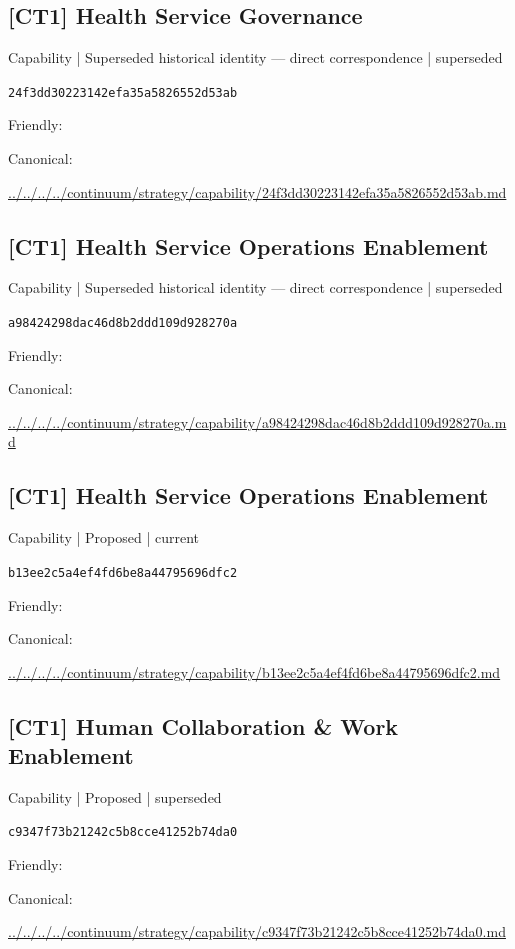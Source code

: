 \documentclass[10pt,a4paper]{article}
\begin{document}
\subsection*{[CT1] Health Service Governance}
{\small Capability | Superseded historical identity — direct correspondence | superseded}\par
\texttt{24f3dd30223142efa35a5826552d53ab}\par
Friendly: \par
Canonical: \par
{\footnotesize\url{../../../../continuum/strategy/capability/24f3dd30223142efa35a5826552d53ab.md}}\par
\subsection*{[CT1] Health Service Operations Enablement}
{\small Capability | Superseded historical identity — direct correspondence | superseded}\par
\texttt{a98424298dac46d8b2ddd109d928270a}\par
Friendly: \par
Canonical: \par
{\footnotesize\url{../../../../continuum/strategy/capability/a98424298dac46d8b2ddd109d928270a.md}}\par
\subsection*{[CT1] Health Service Operations Enablement}
{\small Capability | Proposed | current}\par
\texttt{b13ee2c5a4ef4fd6be8a44795696dfc2}\par
Friendly: \par
Canonical: \par
{\footnotesize\url{../../../../continuum/strategy/capability/b13ee2c5a4ef4fd6be8a44795696dfc2.md}}\par
\subsection*{[CT1] Human Collaboration \& Work Enablement}
{\small Capability | Proposed | superseded}\par
\texttt{c9347f73b21242c5b8cce41252b74da0}\par
Friendly: \par
Canonical: \par
{\footnotesize\url{../../../../continuum/strategy/capability/c9347f73b21242c5b8cce41252b74da0.md}}\par
\end{document}
